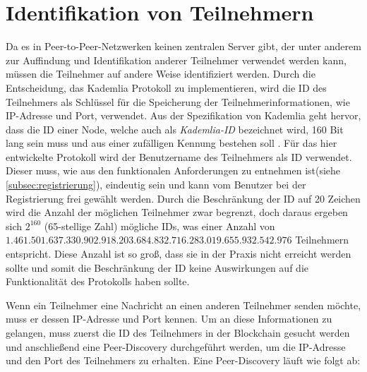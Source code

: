 \section{Identifikation von Teilnehmern}
\label{subsec:identifikation_von_teilnehmern}

Da es in Peer-to-Peer-Netzwerken keinen zentralen Server gibt, der unter anderem zur Auffindung und Identifikation anderer Teilnehmer verwendet werden kann, müssen die Teilnehmer auf andere Weise identifiziert werden. Durch die Entscheidung, das Kademlia Protokoll zu implementieren, wird die ID des Teilnehmers als Schlüssel für die Speicherung der Teilnehmerinformationen, wie IP-Adresse und Port, verwendet.
Aus der Spezifikation von Kademlia geht hervor, dass die ID einer Node, welche auch als \textit{Kademlia-ID} bezeichnet wird, 160 Bit lang sein muss und aus einer zufälligen Kennung bestehen soll \parencite[S. 2]{Maymounkov_Kademlia}. Für das hier entwickelte Protokoll wird der Benutzername des Teilnehmers als ID verwendet. Dieser muss, wie aus den funktionalen Anforderungen zu entnehmen ist(siehe \ref{subsec:registrierung}), eindeutig sein und kann vom Benutzer bei der Registrierung frei gewählt werden. 
Durch die Beschränkung der ID auf 20 Zeichen wird die Anzahl der möglichen Teilnehmer zwar begrenzt, doch daraus ergeben sich $2^{160}$ (65-stellige Zahl) mögliche IDs, was einer Anzahl von $1.461.501.637.330.902.918.203.684.832.716.283.019.655.932.542.976$ Teilnehmern entspricht. Diese Anzahl ist so groß, dass sie in der Praxis nicht erreicht werden sollte und somit die Beschränkung der ID keine Auswirkungen auf die Funktionalität des Protokolls haben sollte.

Wenn ein Teilnehmer eine Nachricht an einen anderen Teilnehmer senden möchte, muss er dessen IP-Adresse und Port kennen. Um an diese Informationen zu gelangen, muss zuerst die ID des Teilnehmers in der Blockchain gesucht werden und anschließend eine Peer-Discovery durchgeführt werden, um die IP-Adresse und den Port des Teilnehmers zu erhalten. Eine Peer-Discovery läuft wie folgt ab:

